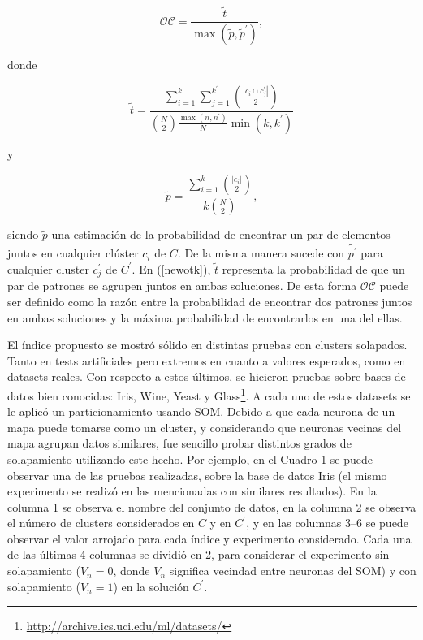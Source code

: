 \documentclass[a4paper,8pt]{article}
\begin{document}
\begin{equation}
	\mathcal{OC} = \frac
		{\tilde{t}}
		{\max(\tilde{p},\tilde{p}^\prime)},
	\label{final:formula}
\end{equation}

\noindent donde 

\begin{equation}
	\tilde{t} = \frac
		{\sum\limits_{i=1}^{k} 
			\sum\limits_{j=1}^{k^{\prime}} \binom{\left|c_i \cap c_j^{\prime}\right|}{2}}
		{\binom{N}{2} \frac{\max(n, n^{\prime})}{N} \min(k,k^{\prime})}
	\label{newotk}
\end{equation}

\noindent y

\begin{equation}
	\tilde{p} = \frac{\sum\limits_{i=1}^{k} \binom{\left|c_i\right|}{2}}
					{k\binom{N}{2}},
	\label{newopk}
\end{equation}

\noindent siendo $\tilde{p}$ una estimación de la probabilidad de encontrar un par de elementos juntos en cualquier clúster $c_i$ de $C$. De la misma manera sucede con $\tilde{p^\prime}$ para cualquier cluster $c^\prime_j$ de $C^\prime$. En (\ref{newotk}), $\tilde{t}$ representa la probabilidad de que un par de patrones se agrupen juntos en ambas soluciones. 
De esta forma $\mathcal{OC}$ puede ser definido como la razón entre la probabilidad de encontrar dos patrones juntos en ambas soluciones y la máxima probabilidad de encontrarlos en una del ellas.


El índice propuesto se mostró sólido en distintas pruebas con clusters solapados. Tanto en tests artificiales pero extremos en cuanto a valores esperados, como en datasets reales. Con respecto a estos últimos, se hicieron pruebas sobre bases de datos bien conocidas: Iris, Wine, Yeast y Glass\footnote{\url{http://archive.ics.uci.edu/ml/datasets/}}. A cada uno de estos datasets se le aplicó un particionamiento usando SOM. Debido a que cada neurona de un mapa puede tomarse como un cluster, y considerando que neuronas vecinas del mapa agrupan datos similares, fue sencillo probar distintos grados de solapamiento utilizando este hecho. 
Por ejemplo, en el Cuadro 1 %
se puede observar una de las pruebas realizadas, sobre la base de datos Iris (el mismo experimento se realizó en las mencionadas con similares resultados). En la columna 1 se observa el nombre del conjunto de datos, en la columna 2 se observa el número de clusters considerados en $C$ y en $C^\prime$, y en las columnas 3--6 se puede observar el valor arrojado para cada índice y experimento considerado. Cada una de las últimas 4 columnas se dividió en 2, para considerar el experimento sin solapamiento ($V_n=0$, donde $V_n$ significa vecindad entre neuronas del SOM) y con solapamiento ($V_n=1$) en la solución $C^\prime$. 
\end{document}
